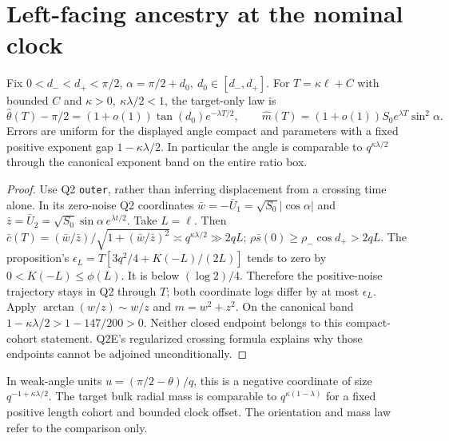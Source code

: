\documentclass[11pt]{article}
\begin{document}
\section{Left-facing ancestry at the nominal clock}\label{an04crav1:seed}
\begin{lemma}\label{an04crav1:outer}
Fix \(0<d_-<d_+<\pi/2\), \(\alpha=\pi/2+d_0,\ d_0\in[d_-,d_+]\).
For \(T=\kappa\ell+C\) with bounded \(C\) and \(\kappa>0,\
\kappa\lambda/2<1\), the target-only law is
\[
 \widehat\theta(T)-\pi/2=(1+o(1))\tan(d_0)e^{-\lambda T/2},
 \qquad
 \widehat m(T)=(1+o(1))S_0e^{\lambda T}\sin^2\alpha .
\]
Errors are uniform for the displayed angle compact and parameters
with a fixed positive exponent gap \(1-\kappa\lambda/2\).
In particular the angle is comparable to \(q^{\kappa\lambda/2}\)
through the canonical exponent band on the entire ratio box.
\end{lemma}
\begin{proof}
Use Q2 \texttt{outer}, rather than inferring displacement from a
crossing time alone. In its zero-noise Q2 coordinates
\(\bar w=-\bar U_1=\sqrt{S_0}|\cos\alpha|\) and
\(\bar z=\bar U_2=\sqrt{S_0}\sin\alpha\,e^{\lambda t/2}\).
Take \(L=\ell\). Then
\(\bar c(T)=(\bar w/\bar z)/\sqrt{1+(\bar w/\bar z)^2}
\asymp q^{\kappa\lambda/2}\gg2qL\);
\(\rho\bar s(0)\ge\rho_-\cos d_+>2qL\). The proposition's
\(\epsilon_L=T[3q^2/4+K(-L)/(2L)]\) tends to zero by
\(0<K(-L)\le\phi(L)\). It is below \((\log2)/4\).
Therefore the positive-noise trajectory stays in Q2 through \(T\);
both coordinate logs differ by at most \(\epsilon_L\). Apply
\(\arctan(w/z)\sim w/z\) and \(m=w^2+z^2\). On the canonical band
\(1-\kappa\lambda/2>1-147/200>0\). Neither closed endpoint
belongs to this compact-cohort statement. Q2E's regularized crossing
formula explains why those endpoints cannot be adjoined unconditionally.
\end{proof}
In weak-angle units \(u=(\pi/2-\theta)/q\), this is a negative
coordinate of size \(q^{-1+\kappa\lambda/2}\). The target bulk radial
mass is comparable to \(q^{\kappa(1-\lambda)}\) for a fixed positive
length cohort and bounded clock offset. The orientation and mass law
refer to the comparison only.
\end{document}
